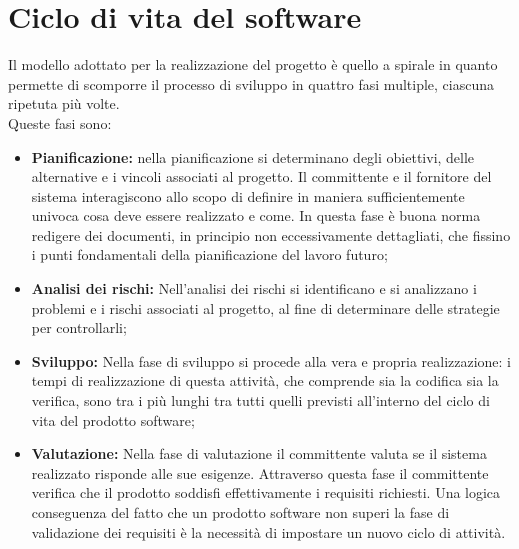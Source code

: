 \section{Ciclo di vita del software}
\label{sec:ciclo-vita-software}
Il modello adottato per la realizzazione del progetto è quello a spirale in quanto permette di scomporre il processo di sviluppo in quattro fasi multiple, ciascuna ripetuta più volte.
\\
Queste fasi sono:
\begin{itemize}
    \item \textbf{Pianificazione:} nella pianificazione si determinano degli obiettivi, delle alternative e i vincoli associati al progetto. Il committente e il fornitore del sistema interagiscono allo scopo di definire in maniera sufficientemente univoca cosa deve essere realizzato e come. In questa fase è buona norma redigere dei documenti, in principio non eccessivamente dettagliati, che fissino i punti fondamentali della pianificazione del lavoro futuro;
    
    \item \textbf{Analisi dei rischi:} Nell'analisi dei rischi si identificano e si analizzano i problemi e i rischi associati al progetto, al fine di determinare delle strategie per controllarli;
    
    \item \textbf{Sviluppo:} Nella fase di sviluppo si procede alla vera e propria realizzazione: i tempi di realizzazione di questa attività, che comprende sia la codifica sia la verifica, sono tra i più lunghi tra tutti quelli previsti all'interno del ciclo di vita del prodotto software;
    
    \item \textbf{Valutazione:} Nella fase di valutazione il committente valuta se il sistema realizzato risponde alle sue esigenze. Attraverso questa fase il committente verifica che il prodotto soddisfi effettivamente i requisiti richiesti. Una logica conseguenza del fatto che un prodotto software non superi la fase di validazione dei requisiti è la necessità di impostare un nuovo ciclo di attività.
\end{itemize}

